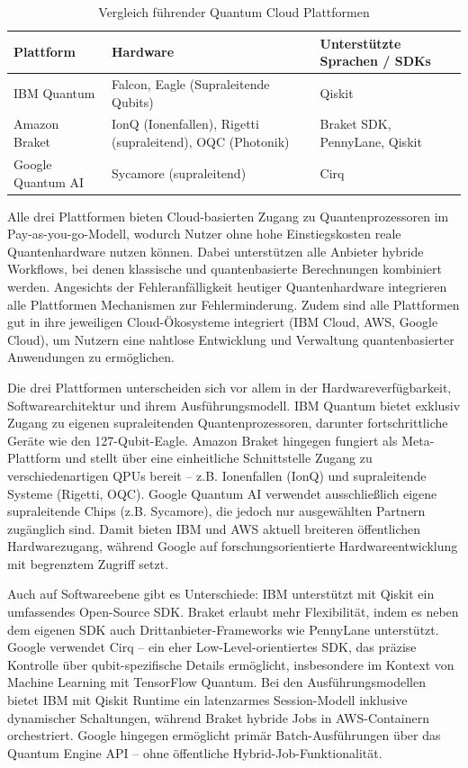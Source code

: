 \begin{table}[ht!]
\centering
\begin{tabular}{|p{2.5cm}|p{4.8cm}|p{4cm}|}
\hline
\textbf{Plattform} & \textbf{Hardware} & \textbf{Unterstützte Sprachen / SDKs} \\
\hline
IBM Quantum & Falcon, Eagle (Supraleitende Qubits) & Qiskit \\
\hline
Amazon Braket & IonQ (Ionenfallen), Rigetti (supraleitend), OQC (Photonik) & Braket SDK, PennyLane, Qiskit \\
\hline
Google Quantum AI & Sycamore (supraleitend) & Cirq \\
\hline
\end{tabular}
\caption{Vergleich führender Quantum Cloud Plattformen}
\label{tab:quantum-cloud-platforms}
\end{table}

Alle drei Plattformen bieten Cloud-basierten Zugang zu Quantenprozessoren im Pay-as-you-go-Modell, wodurch Nutzer ohne hohe Einstiegskosten reale Quantenhardware nutzen können. Dabei unterstützen alle Anbieter hybride Workflows, bei denen klassische und quantenbasierte Berechnungen kombiniert werden. Angesichts der Fehleranfälligkeit heutiger Quantenhardware integrieren alle Plattformen Mechanismen zur Fehlerminderung. Zudem sind alle Plattformen gut in ihre jeweiligen Cloud-Ökosysteme integriert (IBM Cloud, AWS, Google Cloud), um Nutzern eine nahtlose Entwicklung und Verwaltung quantenbasierter Anwendungen zu ermöglichen.

Die drei Plattformen unterscheiden sich vor allem in der Hardwareverfügbarkeit, Softwarearchitektur und ihrem Ausführungsmodell. IBM Quantum bietet exklusiv Zugang zu eigenen supraleitenden Quantenprozessoren, darunter fortschrittliche Geräte wie den 127-Qubit-Eagle. Amazon Braket hingegen fungiert als Meta-Plattform und stellt über eine einheitliche Schnittstelle Zugang zu verschiedenartigen QPUs bereit – z.B. Ionenfallen (IonQ) und supraleitende Systeme (Rigetti, OQC). Google Quantum AI verwendet ausschließlich eigene supraleitende Chips (z.B. Sycamore), die jedoch nur ausgewählten Partnern zugänglich sind. Damit bieten IBM und AWS aktuell breiteren öffentlichen Hardwarezugang, während Google auf forschungsorientierte Hardwareentwicklung mit begrenztem Zugriff setzt.

Auch auf Softwareebene gibt es Unterschiede: IBM unterstützt mit Qiskit ein umfassendes Open-Source SDK. Braket erlaubt mehr Flexibilität, indem es neben dem eigenen SDK auch Drittanbieter-Frameworks wie PennyLane unterstützt. Google verwendet Cirq – ein eher Low-Level-orientiertes SDK, das präzise Kontrolle über qubit-spezifische Details ermöglicht, insbesondere im Kontext von Machine Learning mit TensorFlow Quantum. Bei den Ausführungsmodellen bietet IBM mit Qiskit Runtime ein latenzarmes Session-Modell inklusive dynamischer Schaltungen, während Braket hybride Jobs in AWS-Containern orchestriert. Google hingegen ermöglicht primär Batch-Ausführungen über das Quantum Engine API – ohne öffentliche Hybrid-Job-Funktionalität. \autocite{googleGoogleQuantumComputing2025} \autocite{mittalQiskitRuntimeCloudNative2022} \autocite{amazonwebservicesAmazonBraketFeatures2025}

